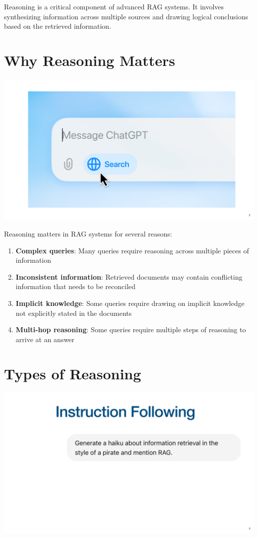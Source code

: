 \documentclass[
  letterpaper,
  oneside]{scrbook}
\providecommand{\tightlist}{%
  \setlength{\itemsep}{0pt}\setlength{\parskip}{0pt}}\usepackage{longtable,booktabs,array}
\begin{document}
Reasoning is a critical component of advanced RAG systems. It involves
synthesizing information across multiple sources and drawing logical
conclusions based on the retrieved information.

\section{Why Reasoning Matters}\label{why-reasoning-matters}

\includegraphics{chapters/../p3-images/slide_2.png}

Reasoning matters in RAG systems for several reasons:

\begin{enumerate}
\def\labelenumi{\arabic{enumi}.}
\tightlist
\item
  \textbf{Complex queries}: Many queries require reasoning across
  multiple pieces of information
\item
  \textbf{Inconsistent information}: Retrieved documents may contain
  conflicting information that needs to be reconciled
\item
  \textbf{Implicit knowledge}: Some queries require drawing on implicit
  knowledge not explicitly stated in the documents
\item
  \textbf{Multi-hop reasoning}: Some queries require multiple steps of
  reasoning to arrive at an answer
\end{enumerate}

\section{Types of Reasoning}\label{types-of-reasoning}

\includegraphics{chapters/../p3-images/slide_3.png}
\end{document}
